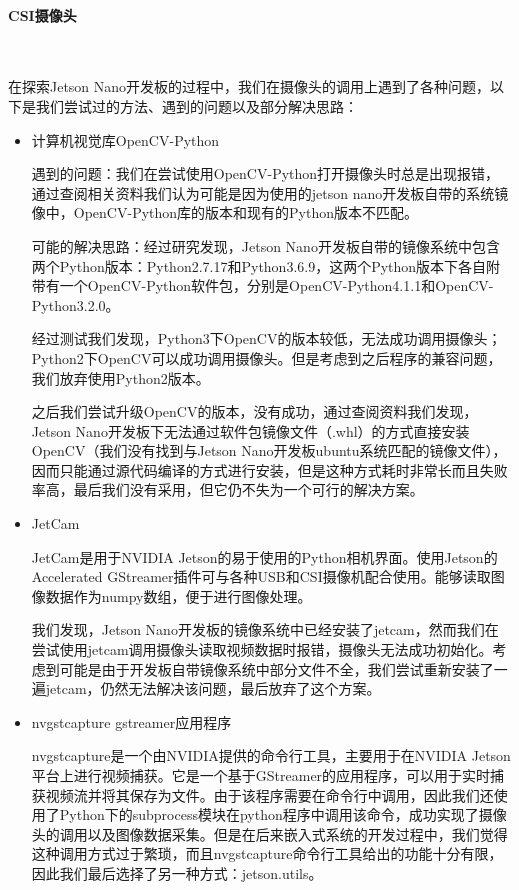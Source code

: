 \documentclass[UTF8]{article}
\begin{document}
\paragraph{CSI摄像头}~{}

在探索Jetson Nano开发板的过程中，我们在摄像头的调用上遇到了各种问题，以下是我们尝试过的方法、遇到的问题以及部分解决思路：
\begin{itemize}
    \item 计算机视觉库OpenCV-Python 
    
    遇到的问题：我们在尝试使用OpenCV-Python打开摄像头时总是出现报错，通过查阅相关资料我们认为可能是因为使用的jetson nano开发板自带的系统镜像中，OpenCV-Python库的版本和现有的Python版本不匹配。

    可能的解决思路：经过研究发现，Jetson Nano开发板自带的镜像系统中包含两个Python版本：Python2.7.17和Python3.6.9，这两个Python版本下各自附带有一个OpenCV-Python软件包，分别是OpenCV-Python4.1.1和OpenCV-Python3.2.0。

    经过测试我们发现，Python3下OpenCV的版本较低，无法成功调用摄像头；Python2下OpenCV可以成功调用摄像头。但是考虑到之后程序的兼容问题，我们放弃使用Python2版本。

    之后我们尝试升级OpenCV的版本，没有成功，通过查阅资料我们发现，Jetson Nano开发板下无法通过软件包镜像文件（.whl）的方式直接安装OpenCV（我们没有找到与Jetson Nano开发板ubuntu系统匹配的镜像文件），因而只能通过源代码编译的方式进行安装，但是这种方式耗时非常长而且失败率高，最后我们没有采用，但它仍不失为一个可行的解决方案。

    \item JetCam
    
    JetCam是用于NVIDIA Jetson的易于使用的Python相机界面。使用Jetson的Accelerated GStreamer插件可与各种USB和CSI摄像机配合使用。能够读取图像数据作为numpy数组，便于进行图像处理。

    我们发现，Jetson Nano开发板的镜像系统中已经安装了jetcam，然而我们在尝试使用jetcam调用摄像头读取视频数据时报错，摄像头无法成功初始化。考虑到可能是由于开发板自带镜像系统中部分文件不全，我们尝试重新安装了一遍jetcam，仍然无法解决该问题，最后放弃了这个方案。

    \item nvgstcapture gstreamer应用程序
        
    nvgstcapture是一个由NVIDIA提供的命令行工具，主要用于在NVIDIA Jetson平台上进行视频捕获。它是一个基于GStreamer的应用程序，可以用于实时捕获视频流并将其保存为文件。由于该程序需要在命令行中调用，因此我们还使用了Python下的subprocess模块在python程序中调用该命令，成功实现了摄像头的调用以及图像数据采集。但是在后来嵌入式系统的开发过程中，我们觉得这种调用方式过于繁琐，而且nvgstcapture命令行工具给出的功能十分有限，因此我们最后选择了另一种方式：jetson.utils。


\end{itemize}
\end{document}
